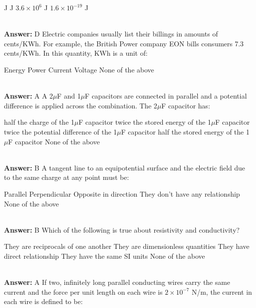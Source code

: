 \documentclass[11pt,addpoints]{exam}
\begin{document}
{{{\begin{questions}
\begin{oneparchoices}
						 J
						 J
						\choice $3.6\times10^{6}$ J
						\choice $1.6\times10^{-19}$ J
					\end{oneparchoices}
					\\ \textbf{Answer:} D
					\question Electric companies usually list their billings in amounts of cents/KWh. For example, the British Power company EON bills consumers 7.3 cents/KWh. In this quantity, KWh is a unit of:\\
					\begin{oneparchoices}
						\choice Energy
						\choice Power
						\choice Current
						\choice Voltage
						\choice None of the above
					\end{oneparchoices}
					\\ \textbf{Answer:} A
					\question A 2$\mu$F and 1$\mu$F capacitors are connected in parallel and a potential difference is applied across the combination. The 2$\mu$F capacitor has:
					\begin{oneparchoices}
						\choice half the charge of the 1$\mu$F capacitor
						\choice twice the stored energy of the 1$\mu$F capacitor
						\choice twice the potential difference of the 1$\mu$F capacitor
						\choice half the stored energy of the 1$\mu$F capacitor
						\choice None of the above
					\end{oneparchoices}
					\\ \textbf{Answer:} B
					\question A tangent line to an equipotential surface and the electric field due to the same charge at any point must be:\\
					\begin{oneparchoices}
						\choice Parallel
						\choice Perpendicular
						\choice Opposite in direction
						\choice They don't have any relationship
						\choice None of the above
					\end{oneparchoices}
					\\ \textbf{Answer:} B
					\question Which of the following is true about resistivity and conductivity?\\
					\begin{oneparchoices}
						\choice They are reciprocals of one another
						\choice They are dimensionless quantities
						\choice They have direct relationship
						\choice They have the same SI units
						\choice None of the above
					\end{oneparchoices}
					\\ \textbf{Answer:} A
					\question If two, infinitely long parallel conducting wires carry the same current and the force per unit length on each wire is $2\times10^{-7}$ N/m, the current in each wire is defined to be:\\

\end{questions}}}}
\end{document}
